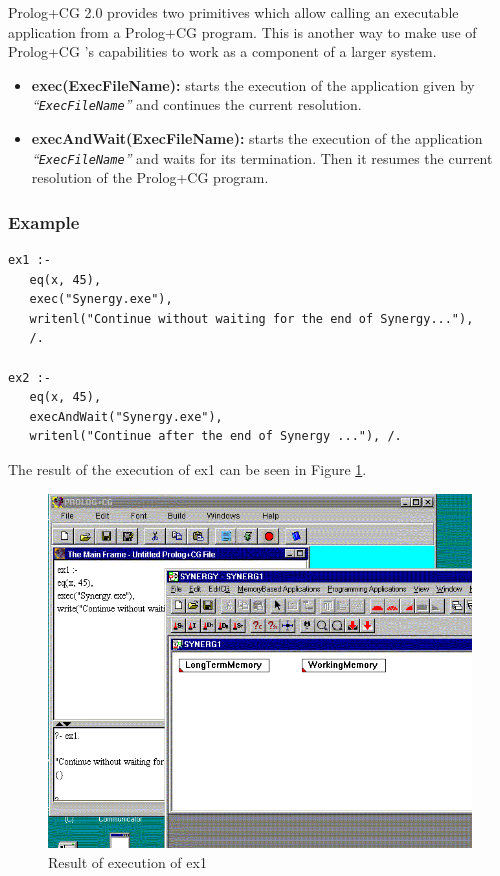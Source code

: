 \documentclass{book}
\begin{document}
Prolog+CG 2.0 provides two primitives which allow calling an
executable application from a Prolog+CG program.  This is another way
to make use of Prolog+CG 's capabilities to work as a component of a
larger system.

\begin{itemize}

\item {\bf exec(ExecFileName):} starts the execution of the
application given by {\it ``\texttt{ExecFileName}''} and continues the
current resolution.

\item {\bf execAndWait(ExecFileName):} starts the execution of the
application {\it ``\texttt{ExecFileName}''} and waits for its
termination.  Then it resumes the current resolution of the Prolog+CG
program.

\end{itemize}

\subsubsection{Example}


\begin{verbatim}
ex1 :-
   eq(x, 45),
   exec("Synergy.exe"),
   writenl("Continue without waiting for the end of Synergy..."), 
   /.

ex2 :-
   eq(x, 45),
   execAndWait("Synergy.exe"),
   writenl("Continue after the end of Synergy ..."), /.
\end{verbatim}




The result of the execution of ex1 can be seen in Figure
\ref{Fig:ppcgsyn}.

\begin{latexonly}

\begin{figure}
\begin{center}
\includegraphics[scale=0.4]{ppcgsyn.png}
\end{center}
\caption{\label{Fig:ppcgsyn}Result of execution of ex1}
\end{figure}

\end{latexonly}
\end{document}
